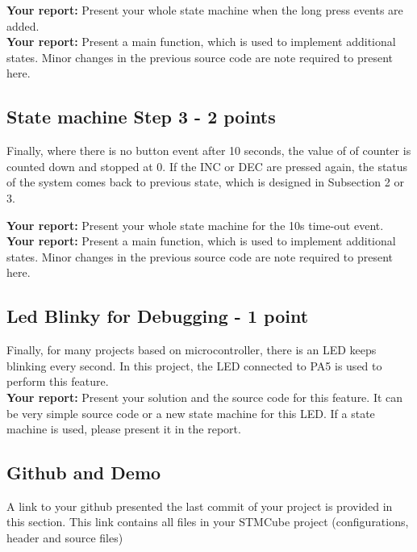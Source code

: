 \textbf{Your report: } Present your whole state machine when the long press events are added.\\

\textbf{Your report: } Present a main function, which is used to implement additional states. Minor changes in the previous source code are note required to present here.\\


\subsection{State machine Step 3 - 2 points}
Finally, where there is no button event after 10 seconds, the value of of counter is counted down and stopped at 0. If the INC or DEC are pressed again, the status of the system comes back to previous state, which is designed in Subsection 2 or 3.

\textbf{Your report: } Present your whole state machine for the 10s time-out event.\\

\textbf{Your report: } Present a main function, which is used to implement additional states. Minor changes in the previous source code are note required to present here.\\

\subsection{Led Blinky for Debugging - 1 point}

Finally, for many projects based on microcontroller, there is an LED keeps blinking every second. In this project, the LED connected to PA5 is used to perform this feature.\\

\textbf{Your report: } Present your solution and the source code for this feature. It can be very simple source code or a new state machine for this LED. If a state machine is used, please present it in the report.

\subsection{Github and Demo}

A link to your github presented the last commit of your project is provided in this section. This link contains all files in your STMCube project (configurations, header and source files)\\



